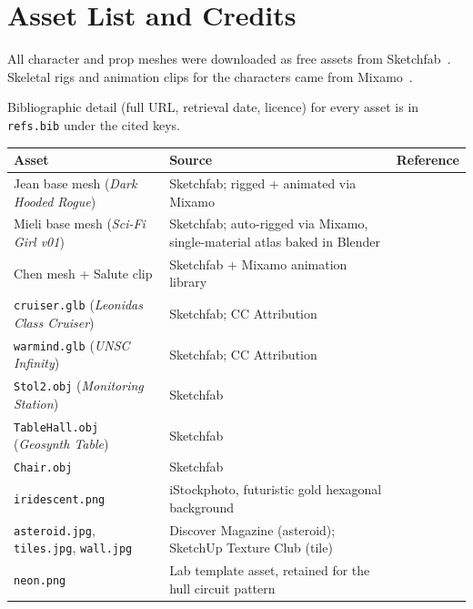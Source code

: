\documentclass[11pt,a4paper]{article}
\begin{document}
\section{Asset List and Credits}\label{sec:assets}

All character and prop meshes were downloaded as free assets from
Sketchfab~\cite{sketchfab}. Skeletal rigs and animation clips for the
characters came from Mixamo~\cite{mixamo}.

Bibliographic detail (full URL, retrieval date, licence) for every asset is
in \texttt{refs.bib} under the cited keys.

\begin{center}
\small
\begin{longtable}{p{4.5cm} p{6.5cm} p{3.0cm}}
\toprule
\textbf{Asset} & \textbf{Source} & \textbf{Reference} \\
\midrule
\endhead
Jean base mesh (\textit{Dark Hooded Rogue})
  & Sketchfab; rigged + animated via Mixamo
  & \cite{model_jean,mixamo} \\
Mieli base mesh (\textit{Sci-Fi Girl v01})
  & Sketchfab; auto-rigged via Mixamo, single-material atlas baked in Blender
  & \cite{model_mieli,mixamo} \\
Chen mesh + Salute clip
  & Sketchfab + Mixamo animation library
  & \cite{mixamo} \\
\texttt{cruiser.glb} (\textit{Leonidas Class Cruiser})
  & Sketchfab; CC Attribution
  & \cite{model_cruiser} \\
\texttt{warmind.glb} (\textit{UNSC Infinity})
  & Sketchfab; CC Attribution
  & \cite{model_warmind} \\
\texttt{Stol2.obj} (\textit{Monitoring Station})
  & Sketchfab
  & \cite{model_monitor} \\
\texttt{TableHall.obj} (\textit{Geosynth Table})
  & Sketchfab
  & \cite{model_table} \\
\texttt{Chair.obj}
  & Sketchfab
  & \cite{model_chair} \\
\texttt{iridescent.png}
  & iStockphoto, futuristic gold hexagonal background
  & \cite{tex_iridescent} \\
\texttt{asteroid.jpg}, \texttt{tiles.jpg}, \texttt{wall.jpg}
  & Discover Magazine (asteroid); SketchUp Texture Club (tile)
  & \cite{tex_asteroids,tex_floor_tile} \\
\texttt{neon.png}
  & Lab template asset, retained for the hull circuit pattern

\end{longtable}
\end{center}
\end{document}
